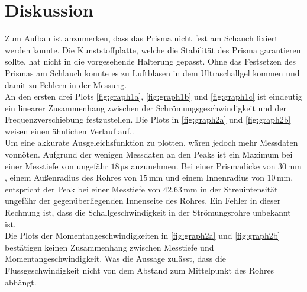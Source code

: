 \section{Diskussion}
\label{sec:diskussion}

Zum Aufbau ist anzumerken, dass das Prisma nicht fest am Schauch fixiert werden konnte. Die Kunststoffplatte, welche die Stabilität des Prisma garantieren sollte, hat nicht in die vorgesehende Halterung gepasst.
Ohne das Festsetzen des Prismas am Schlauch konnte es zu Luftblasen in dem Ultraschallgel kommen und damit zu Fehlern in der Messung. \\

An den ersten drei Plots \autoref{fig:graph1a}, \autoref{fig:graph1b} und \autoref{fig:graph1c} ist eindeutig ein linearer Zusammenhang zwischen der Schrömungsgeschwindigkeit und der Frequenzverschiebung festzustellen.
Die Plots in \autoref{fig:graph2a} und \autoref{fig:graph2b} weisen einen ähnlichen Verlauf auf,. \\
Um eine akkurate Ausgeleichsfunktion zu plotten, wären jedoch mehr Messdaten vonnöten. 
Aufgrund der wenigen Messdaten an den Peaks ist ein Maximum bei einer Messtiefe von ungefähr $18  \, \unit{\micro\second}$ anzunehmen. 
Bei einer Prismadicke von $30 \, \unit{\milli\meter} $, einem Außenradius des Rohres von $15 \, \unit{\milli\meter} $ und einem Innenradius von $10 \, \unit{\milli\meter}  $, entspricht der Peak bei einer Messtiefe von  $42.63 \, \unit{\milli\meter} $ in der Streuintensität ungefähr der gegenüberliegenden Innenseite des Rohres.
Ein Fehler in dieser Rechnung ist, dass die Schallgeschwindigkeit in der Strömungsrohre unbekannt ist.\\


Die Plots der Momentangeschwindigkeiten in \autoref{fig:graph2a} und \autoref{fig:graph2b} bestätigen keinen Zusammenhang zwischen Messtiefe und Momentangeschwindigkeit.
Was die Aussage zulässt, dass die Flussgeschwindigkeit nicht von dem Abstand zum Mittelpunkt des Rohres abhängt.